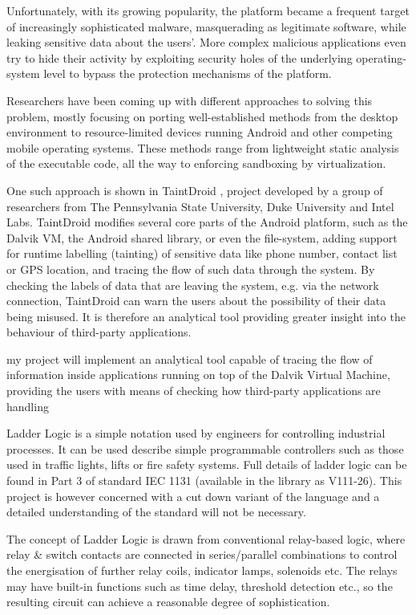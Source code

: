 \documentclass[12pt]{article}
\begin{document}
Unfortunately, with its growing popularity, the platform became a frequent
target of increasingly sophisticated malware, masquerading as legitimate
software, while leaking sensitive data about the users'. More complex
malicious applications even try to hide their activity by exploiting 
security holes of the underlying operating-system level to bypass the 
protection mechanisms of the platform.

Researchers have been coming up with different approaches to solving
this problem, mostly focusing on porting well-established methods from
the desktop environment to resource-limited devices running Android and
other competing mobile operating systems. These methods range from 
lightweight static analysis of the executable code, all the way to 
enforcing sandboxing by virtualization. 

One such approach is shown in TaintDroid \cite{www.appanalysis.org}, 
project developed by a group of researchers from The Pennsylvania State
University, Duke University and Intel Labs. TaintDroid modifies several
core parts of the Android platform, such as the Dalvik VM, the
Android shared library, or even the file-system, adding support for
runtime labelling (tainting) of sensitive data like phone number, contact 
list or GPS location, and tracing the flow of such data through the 
system. By checking the labels of data that are leaving the system, 
e.g. via the network connection, TaintDroid can warn the users about the
possibility of their data being misused. It is therefore an analytical 
tool providing greater insight into the behaviour of third-party 
applications.


my project will implement an analytical tool capable of tracing the flow
of information inside applications running on top of the Dalvik Virtual
Machine, providing the users with means of checking how third-party 
applications are handling 



Ladder Logic is a simple notation used by engineers for controlling
industrial processes. It can be used describe simple programmable
controllers such as those used in traffic lights, lifts or fire safety
systems. Full details of ladder logic can be found in Part 3 of
standard IEC 1131 (available in the library as V111-26).  This project
is however concerned with a cut down variant of the language and a
detailed understanding of the standard will not be necessary.

The concept of Ladder Logic is drawn from conventional relay-based
logic, where relay \& switch contacts are connected in series/parallel
combinations to control the energisation of further relay coils,
indicator lamps, solenoids etc. The relays may have built-in functions
such as time delay, threshold detection etc., so the resulting circuit
can achieve a reasonable degree of sophistication.
\end{document}
